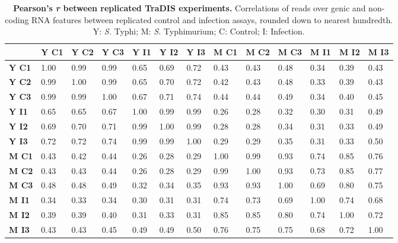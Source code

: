%
\begin{table}
   \tiny
   \centering
   \noindent
    \caption[Pearson's {\it r} between replicated TraDIS experiments]{\textbf{Pearson's {\it r} between replicated TraDIS experiments.} Correlations of reads over genic and non-coding RNA features between replicated control and infection assays, rounded down to nearest hundredth. Y: \textit{S.} Typhi; M: \textit{S.} Typhimurium; C: Control; I: Infection. }
    \begin{tabular}{ l
    				l
				l
				l
				l
				l
				l
				l
				l
				l
				l
				l
				l
				}
   
    \\
     \toprule
    &\textbf{Y C1} & \textbf{Y C2} & \textbf{Y C3} & \textbf{Y I1} & \textbf{Y I2} & \textbf{Y I3} &  \textbf{M C1}&  \textbf{M C2} &  \textbf{M C3} &  \textbf{M I1}&  \textbf{M I2}&  \textbf{M I3}\\
    \midrule
\textbf{Y C1} &   1.00 & 0.99 & 0.99 & 0.65 & 0.69 & 0.72 & 0.43 & 0.43 & 0.48 & 0.34 & 0.39 & 0.43\\
\textbf{Y C2} &  0.99 & 1.00 & 0.99 & 0.65 & 0.70 & 0.72 & 0.42 & 0.43 & 0.48 & 0.33 & 0.39 & 0.43\\
 \textbf{Y C3} & 0.99 & 0.99 & 1.00 & 0.67 & 0.71 & 0.74 & 0.44 & 0.44 & 0.49 & 0.34 & 0.40 & 0.45\\
 \textbf{Y I1} & 0.65 & 0.65 & 0.67 & 1.00 & 0.99 & 0.99 & 0.26 & 0.28 & 0.32 & 0.30 & 0.31 & 0.49\\
\textbf{Y I2} &  0.69 & 0.70 & 0.71 & 0.99 & 1.00 & 0.99 & 0.28 & 0.28 & 0.34 & 0.31 & 0.33 & 0.49\\
  \textbf{Y I3} & 0.72 & 0.72 & 0.74 & 0.99 & 0.99 & 1.00 & 0.29 & 0.29 & 0.35 & 0.31 & 0.33 & 0.50\\
 \textbf{M C1}&  0.43 & 0.42 & 0.44 & 0.26 & 0.28 & 0.29 & 1.00 & 0.99 & 0.93 & 0.74 & 0.85 & 0.76\\
\textbf{M C2}&  0.43 & 0.43 & 0.44 & 0.26 & 0.28 & 0.29 & 0.99 & 1.00 & 0.93 & 0.73 & 0.85 & 0.77\\
 \textbf{M C3} &  0.48 & 0.48 & 0.49 & 0.32 & 0.34 & 0.35 & 0.93 & 0.93 & 1.00 & 0.69 & 0.80 & 0.75\\
 \textbf{M I1} & 0.34 & 0.33 & 0.34 & 0.30 & 0.31 & 0.31 & 0.74 & 0.73 & 0.69 & 1.00 & 0.74 & 0.68\\
  \textbf{M I2} & 0.39 & 0.39 & 0.40 & 0.31 & 0.33 & 0.31 & 0.85 & 0.85 & 0.80 & 0.74 & 1.00 & 0.72\\
 \textbf{M I3} &  0.43 & 0.43 & 0.45 & 0.49 & 0.49 & 0.50 & 0.76 & 0.75 & 0.75 & 0.68 & 0.72 & 1.00\\
    \bottomrule
    \end{tabular}%
    \label{tab:pear}%
\end{table}

